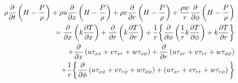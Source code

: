 \begin{equation}
\begin{aligned}
\rho\pdv{t}\left(H-\frac{P}{\rho}\right)
+ \rho u\pdv{x}\left(H-\frac{P}{\rho}\right)
+ \rho v\pdv{r}\left(H-\frac{P}{\rho}\right)
  + \frac{\rho w}{r}\pdv{\phi}\left(H - \frac{P}{\rho}\right) \\
  = \pdv{x}\left(k\pdv{T}{x}\right) + \pdv{r}\left(k\pdv{T}{r}\right) 
  + \frac{1}{r}\bigg\{\pdv{\phi}\left(\frac{1}{r}k\pdv{T}{\phi}\right) 
  + k\pdv{T}{r}\bigg\} \\
  + \pdv{x}\left(u\tau_{xx} + v\tau_{xr} + w\tau_{x\phi}\right)
  + \pdv{r}\left(u\tau_{xr} + v\tau_{rr} + w\tau_{\phi\phi}\right) \\
  + \frac{1}{r}\bigg\{\pdv{\phi}\left(u\tau_{x\phi}+v\tau_{r\phi}+w\tau_{\phi\phi}\right)
  + \left(u\tau_{xr} + v\tau_{rr} + w\tau_{r\phi}\right)\bigg\}
\end{aligned}
\end{equation}
